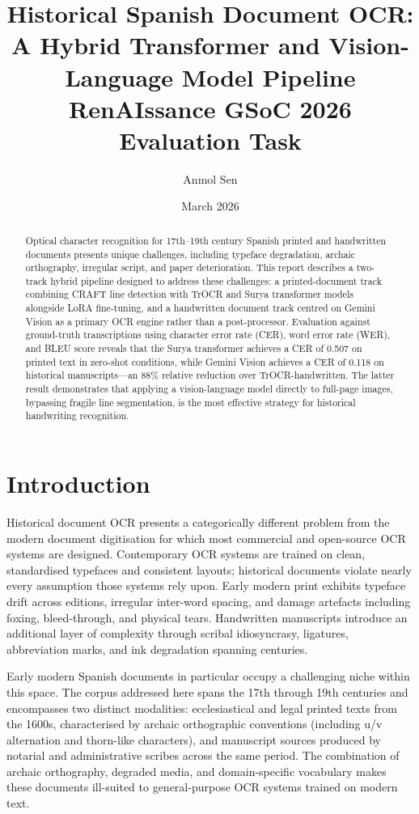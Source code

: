 \documentclass[11pt,a4paper]{article}
\title{\textbf{Historical Spanish Document OCR:\\
A Hybrid Transformer and Vision-Language Model Pipeline}\\[0.5em]
\large RenAIssance GSoC 2026 Evaluation Task}
\author{Anmol Sen}
\date{March 2026}
\begin{document}
\maketitle

\begin{abstract}
Optical character recognition for 17th--19th century Spanish printed and handwritten
documents presents unique challenges, including typeface degradation, archaic orthography,
irregular script, and paper deterioration. This report describes a two-track hybrid pipeline
designed to address these challenges: a printed-document track combining CRAFT line detection
with TrOCR and Surya transformer models alongside LoRA fine-tuning, and a handwritten
document track centred on Gemini Vision as a primary OCR engine rather than a post-processor.
Evaluation against ground-truth transcriptions using character error rate (CER), word error
rate (WER), and BLEU score reveals that the Surya transformer achieves a CER of 0.507 on
printed text in zero-shot conditions, while Gemini Vision achieves a CER of 0.118 on
historical manuscripts---an 88\% relative reduction over TrOCR-handwritten. The latter
result demonstrates that applying a vision-language model directly to full-page images,
bypassing fragile line segmentation, is the most effective strategy for historical
handwriting recognition.
\end{abstract}

\section{Introduction}

Historical document OCR presents a categorically different problem from the modern document
digitisation for which most commercial and open-source OCR systems are designed. Contemporary
OCR systems are trained on clean, standardised typefaces and consistent layouts; historical
documents violate nearly every assumption those systems rely upon. Early modern print
exhibits typeface drift across editions, irregular inter-word spacing, and damage artefacts
including foxing, bleed-through, and physical tears. Handwritten manuscripts introduce an
additional layer of complexity through scribal idiosyncrasy, ligatures, abbreviation marks,
and ink degradation spanning centuries.

Early modern Spanish documents in particular occupy a challenging niche within this space.
The corpus addressed here spans the 17th through 19th centuries and encompasses two distinct
modalities: ecclesiastical and legal printed texts from the 1600s, characterised by archaic
orthographic conventions (including u/v alternation and thorn-like characters), and
manuscript sources produced by notarial and administrative scribes across the same period.
The combination of archaic orthography, degraded media, and domain-specific vocabulary makes
these documents ill-suited to general-purpose OCR systems trained on modern text.
\end{document}
